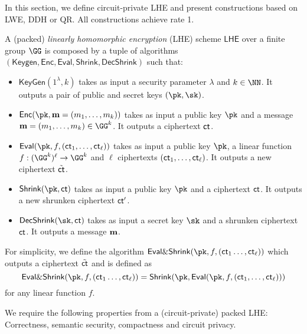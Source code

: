 \def \QR{\mathbb{QR}}
\def \J{\mathbb{J}}
\def \ginvr{\mathbf{g}^{-1}_\mathsf{rnd}}




In this section, we define circuit-private LHE and present constructions based on LWE, DDH or QR. All constructions achieve rate 1.


\begin{definition}
A (packed) \emph{linearly homomorphic encryption} (LHE) scheme $\mathsf{LHE}$ over a finite group $\GG$ is composed by a tuple of algorithms $(\mathsf{Keygen},\mathsf{Enc},\mathsf{Eval},\mathsf{Shrink},\mathsf{DecShrink})$ such that:
\begin{itemize}
    \item $\mathsf{KeyGen}(1^\lambda,k)$ takes as input a security parameter $\lambda$ and $k\in\NN$. It outputs a pair of public and secret keys $(\pk,\sk)$.
    \item $\mathsf{Enc}(\pk,\mn=(m_1,\dots, m_k))$ takes as input a public key $\pk$ and a message $\mn=(m_1,\dots , m_k)\in\GG^k$. It outputs a ciphertext $\mathsf{ct}$.
    \item $\mathsf{Eval}(\pk,f, (\ct_1,\dots, \ct_\ell))$ takes as input a public key $\pk$, a linear function $f:(\GG^{ k})^\ell\to \GG^{k}$ and $\ell$ ciphertexts $(\mathsf{ct}_1,\dots, \mathsf{ct}_\ell)$. It outputs a new ciphertext $\tilde {\mathsf{ct}}$.
    \item $\mathsf{Shrink}(\pk,\ct)$ takes as input a public key $\pk$ and  a ciphertext $\mathsf{ct}$. It outputs a new shrunken ciphertext $\mathsf{ct}'$.
    \item $\mathsf{DecShrink}(\sk,\ct)$ takes as input a secret key $\sk$ and a  shrunken ciphertext $\mathsf{ct}$. It outputs a message $\mathbf{m}$.
\end{itemize}
\end{definition}

For simplicity, we define the algorithm $\mathsf{Eval\& Shrink}(\pk,f,(\ct_1\dots, \ct_\ell))$  which outputs a ciphertext $\tilde {\mathsf{ct}}$  and is defined as $$\evalshrink (\pk,f,(\ct_1\dots, \ct_\ell))=\mathsf{Shrink}(\pk,\mathsf{Eval}(\pk,f, (\ct_1,\dots, \ct_\ell)))$$ for any linear function $f$.

We require the following properties from a (circuit-private) packed LHE: Correctness, semantic security, compactness and circuit privacy.

